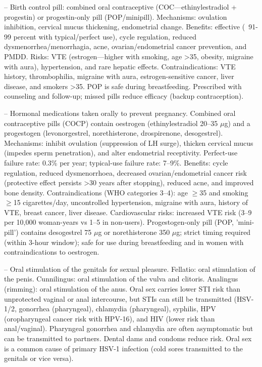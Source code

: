 -- Birth control pill: combined oral contraceptive (COC—ethinylestradiol + progestin) or progestin-only pill (POP/minipill). Mechanisms: ovulation inhibition, cervical mucus thickening, endometrial change. Benefits: effective (~91-99 percent with typical/perfect use), cycle regulation, reduced dysmenorrhea/menorrhagia, acne, ovarian/endometrial cancer prevention, and PMDD. Risks: VTE (estrogen—higher with smoking, age >35, obesity, migraine with aura), hypertension, and rare hepatic effects. Contraindications: VTE history, thrombophilia, migraine with aura, estrogen-sensitive cancer, liver disease, and smokers >35. POP is safe during breastfeeding. Prescribed with counseling and follow-up; missed pills reduce efficacy (backup contraception).

-- Hormonal medications taken orally to prevent pregnancy. Combined oral contraceptive pills (COCP) contain oestrogen (ethinylestradiol 20--35 \(\mu\)g) and a progestogen (levonorgestrel, norethisterone, drospirenone, desogestrel). Mechanisms: inhibit ovulation (suppression of LH surge), thicken cervical mucus (impedes sperm penetration), and alter endometrial receptivity. Perfect-use failure rate: 0.3\% per year; typical-use failure rate: 7--9\%. Benefits: cycle regulation, reduced dysmenorrhoea, decreased ovarian/endometrial cancer risk (protective effect persists >30 years after stopping), reduced acne, and improved bone density. Contraindications (WHO categories 3--4): age \(\ge\)35 and smoking \(\ge\)15 cigarettes/day, uncontrolled hypertension, migraine with aura, history of VTE, breast cancer, liver disease. Cardiovascular risks: increased VTE risk (3--9 per 10,000 woman-years vs 1--5 in non-users). Progestogen-only pill (POP, 'mini-pill') contains desogestrel 75 \(\mu\)g or norethisterone 350 \(\mu\)g; strict timing required (within 3-hour window); safe for use during breastfeeding and in women with contraindications to oestrogen.

-- Oral stimulation of the genitals for sexual pleasure. Fellatio: oral stimulation of the penis. Cunnilingus: oral stimulation of the vulva and clitoris. Analingus (rimming): oral stimulation of the anus. Oral sex carries lower STI risk than unprotected vaginal or anal intercourse, but STIs can still be transmitted (HSV-1/2, gonorrhea (pharyngeal), chlamydia (pharyngeal), syphilis, HPV (oropharyngeal cancer risk with HPV-16), and HIV (lower risk than anal/vaginal). Pharyngeal gonorrhea and chlamydia are often asymptomatic but can be transmitted to partners. Dental dams and condoms reduce risk. Oral sex is a common cause of primary HSV-1 infection (cold sores transmitted to the genitals or vice versa).

